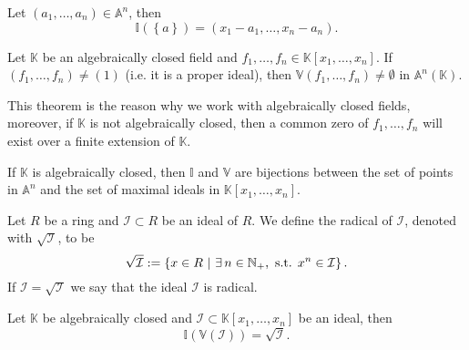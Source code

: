 \begin{lem}
	Let $\left( a_1, \ldots, a_n \right) \in \mathbb{A}^n$, then
	\begin{equation}
		\mathbb{I}\left( \left\{ a \right\} \right) = \left( x_1 - a_1, \ldots, x_n - a_n \right)
	.\end{equation} 
\end{lem} 

\begin{thm}
	Let $\mathbb{K}$ be an algebraically closed field and $f_1, \ldots, f_n \in \mathbb{K}\left[x_1, \ldots, x_n \right]$.
	If $\left( f_1, \ldots, f_n \right) \neq \left( 1 \right)$ (i.e. it is a proper ideal), then $\mathbb{V}\left(f_1, \ldots, f_n\right) \neq \emptyset$ in $\mathbb{A}^n(\mathbb{K})$.
\end{thm}

\begin{rem}
	This theorem is the reason why we work with algebraically closed fields, moreover, if $\mathbb{K}$ is not algebraically closed, then a common zero of $f_1, \ldots, f_n$ will exist over a finite extension of $\mathbb{K}$.
\end{rem}

\begin{cor}
	If $\mathbb{K}$ is algebraically closed, then $\mathbb{I}$ and $\mathbb{V}$ are bijections between the set of points in $\mathbb{A}^n$ and the set of maximal ideals in $\mathbb{K}\left[x_1, \ldots, x_n \right]$.
\end{cor} 

\begin{defn}
	Let $R$ be a ring and $\mathcal{I} \subset R$ be an ideal of $R$.
	We define the radical of $\mathcal{I}$, denoted with $\sqrt{\mathcal{I}}$, to be
	\begin{equation}
		\sqrt{\mathcal{I}} := \left\{ x \in R \ \middle|\ \exists\, n \in \mathbb{N}_+, \text{ s.t. } x^n \in \mathcal{I} \right\}
	.\end{equation} 
	If $\mathcal{I} = \sqrt{\mathcal{I}}$ we say that the ideal $\mathcal{I}$ is radical.
\end{defn}

\begin{prop}[Nullstellensatz]
	Let $\mathbb{K}$ be algebraically closed and $\mathcal{I} \subset \mathbb{K}\left[x_1, \ldots, x_n \right]$ be an ideal, then
	\begin{equation}
		\mathbb{I}\left( \mathbb{V}\left(\mathcal{I}\right) \right) = \sqrt{\mathcal{I}}
	.\end{equation} 
\end{prop} 

